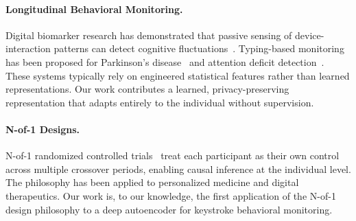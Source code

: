 \paragraph{Longitudinal Behavioral Monitoring.}
Digital biomarker research has demonstrated that passive sensing of
device-interaction patterns can detect cognitive fluctuations~\cite{dagum2018digital}.
Typing-based monitoring has been proposed for Parkinson's disease~\cite{equi2021detection}
and attention deficit detection~\cite{arroyo2009user}.
These systems typically rely on engineered statistical features rather than
learned representations.
Our work contributes a learned, privacy-preserving representation that
adapts entirely to the individual without supervision.

\paragraph{N-of-1 Designs.}
N-of-1 randomized controlled trials~\cite{lillie2011nof1} treat each participant
as their own control across multiple crossover periods, enabling causal inference
at the individual level.
The philosophy has been applied to personalized medicine and digital therapeutics.
Our work is, to our knowledge, the first application of the N-of-1 design
philosophy to a deep autoencoder for keystroke behavioral monitoring.
